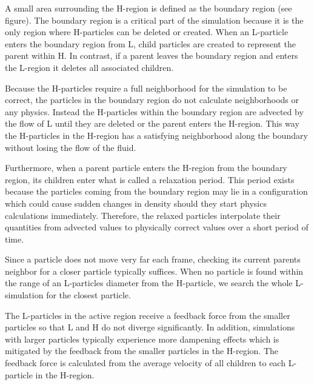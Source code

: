 \documentclass[../../main.tex]{subfiles}
\begin{document}
A small area surrounding the H-region is defined as the boundary region (see figure). The boundary region is a critical part of the simulation because it is the only region where H-particles can be deleted or created. When an L-particle enters the boundary region from L, child particles are created to represent the parent within H. In contrast, if a parent leaves the boundary region and enters the L-region it deletes all associated children. 

Because the H-particles require a full neighborhood for the simulation to be correct, the particles in the boundary region do not calculate neighborhoods or any physics. Instead the H-particles within the boundary region are advected by the flow of L until they are deleted or the parent enters the H-region. This way the H-particles in the H-region has a satisfying neighborhood along the boundary without losing the flow of the fluid. 

Furthermore, when a parent particle enters the H-region from the boundary region, its children enter what is called a relaxation period. This period exists because the particles coming from the boundary region may lie in a configuration which could cause sudden changes in density should they start physics calculations immediately. Therefore, the relaxed particles interpolate their quantities from advected values to physically correct values over a short period of time. 

Since a particle does not move very far each frame, checking its current parents neighbor for a closer particle typically suffices. When no particle is found within the range of an L-particles diameter from the H-particle, we search the whole L-simulation for the closest particle. 

The L-particles in the active region receive a feedback force from the smaller particles so that L and H do not diverge significantly. In addition, simulations with larger particles typically experience more dampening effects which is mitigated by the feedback from the smaller particles in the H-region. The feedback force is calculated from the average velocity of all children to each L-particle in the H-region. 

\end{document}
